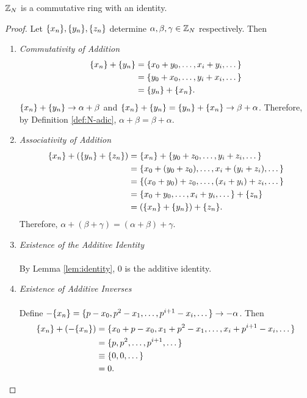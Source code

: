 \begin{theorem}
  $\mathbb{Z}_N$ is a commutative ring with an identity.
\end{theorem}
\begin{proof}
  Let $\{x_n\},\{y_n\},\{z_n\}$ determine $\alpha,\beta,\gamma\in\mathbb{Z}_N$ respectively. Then
  \begin{enumerate}
    \item {\em Commutativity of Addition}
      \begin{align*}
            \{x_n\}+\{y_n\}&=\{x_0+y_0,\dots,x_i+y_i,\dots\} \\
                   &=\{y_0+x_0,\dots,y_i+x_i,\dots\} \\
                   &=\{y_n\}+\{x_n\}.
      \end{align*}
      $\{x_n\}+\{y_n\} \rightarrow \alpha+\beta$ and $\{x_n\}+\{y_n\}=\{y_n\}+\{x_n\} \rightarrow \beta+\alpha$.
      Therefore, by Definition \ref{def:N-adic}, $\alpha+\beta=\beta+\alpha$.
    \item {\em Associativity of Addition}
      \begin{align*}
        \{x_n\}+(\{y_n\}+\{z_n\})&=\{x_n\}+\{y_0+z_0,\dots,y_i+z_i,\dots\} \\
                     &=\{x_0+(y_0+z_0),\dots,x_i+(y_i+z_i),\dots\} \\
                     &=\{(x_0+y_0)+z_0,\dots,(x_i+y_i)+z_i,\dots\} \\
                     &=\{x_0+y_0,\dots,x_i+y_i,\dots\}+\{z_n\} \\
                     &=(\{x_n\}+\{y_n\})+\{z_n\}.
      \end{align*}
      Therefore, $\alpha+(\beta+\gamma)=(\alpha+\beta)+\gamma$.
    \item {\em Existence of the Additive Identity}
      \\ \\
      By Lemma \ref{lem:identity}, $0$ is the additive identity.
    \item {\em Existence of Additive Inverses}
      \\ \\
      Define $-\{x_n\} = \{p-x_0,p^2-x_1,\dots,p^{i+1}-x_i,\dots\} \rightarrow -\alpha$.
      Then
      \begin{align*}
        \{x_n\}+(-\{x_n\})&=\{x_0+p-x_0,x_1+p^2-x_1,\dots,x_i+p^{i+1}-x_i,\dots\} \\
                  &=\{p,p^2,\dots,p^{i+1},\dots\} \\
                  &\equiv\{0,0,\dots\} \\
                  &=0.
      \end{align*}

\end{enumerate}
\end{proof}
